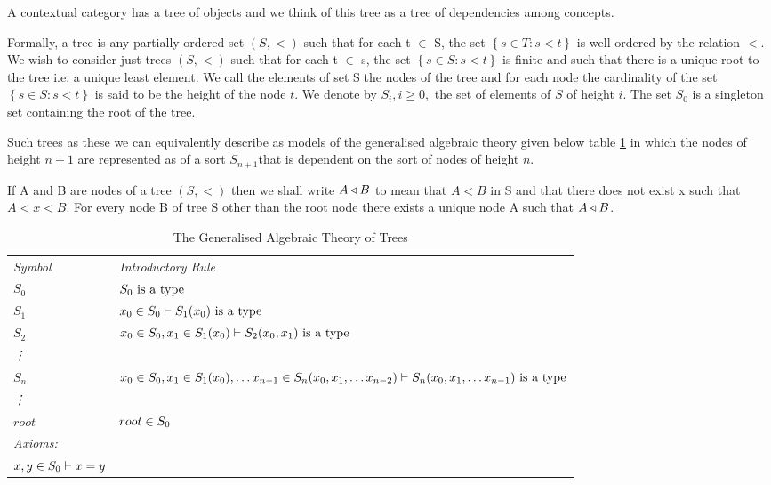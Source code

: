 \documentclass[10pt,a4paper]{scrartcl}
\begin{document}
A contextual category has a tree of objects and we think of this tree as a tree of dependencies among concepts. 

Formally, a tree is any partially ordered set $(S, <)$ such that for each t $\in$ S, the set $\left\{ s \in T : s < t \right\} $ is well-ordered by the relation $<$. We wish to consider just trees $(S,<)$ 
such that for each t $\in$ s, the set $\left\{s \in S : s < t\right\}$ is finite  and such that there is a unique root to the tree i.e. a unique least element. We call the elements of set S the nodes of the tree and for each node the cardinality of the set $\left\{s \in S : s < t\right\}$ is said to be the height of the 
node $t$. We denote by $S_i, i \geq 0,$ the set of elements of $S$ of height $i$. The set $S_0$ is a singleton set containing the root of the tree.

Such trees as these we can equivalently describe as models of the generalised algebraic theory given below table \ref{GATOFTREES} in which the nodes of height $n+1$ are represented as of a sort $S_{n+1}$that is dependent on the sort of nodes of height $n$.

\newcommand{\Ft}[1]{\downarrow \kern -0.325em #1}
If A and B are nodes of  a tree $(S,<)$ then we shall write $A \triangleleft B$ to mean that $A < B$ in S and that
there does not exist x such that $A < x < B$. For every node B of tree S other than the root node there exists a unique node A such that $A \triangleleft B$.

\newcommand{\Sz}{S_0}
\newcommand{\ofS}[1]{\ofT{#1}{\Sz}}
\newcommand{\Si}[1]{S_{#1}}
\newcommand{\ofSi}[3]{\ofT{#1}{\Si{#2}(#3)}}
\vspace{0.03cm} 
\begin{table}[H]
\caption{The Generalised Algebraic Theory of Trees}
\label{GATOFTREES}
\begin{tabular}{>{\itshape}l l}
Symbol & \itshape{Introductory Rule} \\
$\Sz  $&$\isT{\Sz}$\\
$\Si{1} $&$\ofS{x_0} \tstyle \isT{\Si{1}(x_0)} $\\
$\Si{2} $&$\ofS{x_0},\ofSi{x_1}{1}{x_0} \tstyle \isT{\Si{2}(x_0,x_1)} $\\
\vdots  \\
$\Si{n} $&$\ofS{x_0},\ofSi{x_1}{1}{x_0}, \hdots \ofSi{x_{n-1}}{n}{x_0,x_1,\hdots x_{n-2}} \tstyle \isT{\Si{n}(x_0,x_1,\hdots x_{n-1})} $\\
\vdots   \\
$root$ & $\ofT{root}{\Sz}$ \\
\itshape{Axioms}:  \\
$\ofT{x,y}{\Sz} \tstyle x = y$
\end{tabular} \\
\end{table} 
\end{document}
